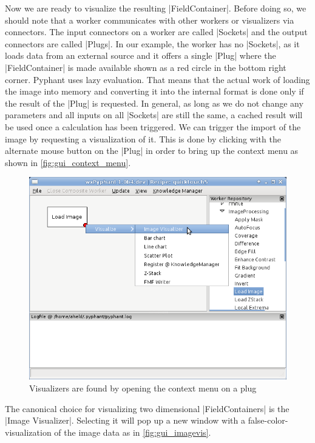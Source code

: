 \documentclass[a4paper]{article}
\begin{document}
Now we are ready to visualize the resulting |FieldContainer|. Before
doing so, we should note that a worker communicates with other workers
or visualizers via connectors. The input connectors on a worker are
called |Sockets| and the output connectors are called |Plugs|. In our
example, the worker has no |Sockets|, as it loads data from an
external source and it offers a single |Plug| where the
|FieldContainer| is made available shown as a red circle in the bottom
right corner. Pyphant uses lazy evaluation. That means that the actual
work of loading the image into memory and converting it into the
internal format is done only if the result of the |Plug| is
requested. In general, as long as we do not change any parameters and
all inputs on all |Sockets| are still the same, a cached result will
be used once a calculation has been triggered. We can trigger the
import of the image by requesting a visualization of it. This is done
by clicking with the alternate mouse button on the |Plug| in order to
bring up the context menu as shown in \autoref{fig:gui_context_menu}.
\begin{figure}[h]
  \centering
  \includegraphics[scale=0.75]{fig/gui_context_menu.png}
  \caption{Visualizers are found by opening the context menu on a plug}
  \label{fig:gui_context_menu}
\end{figure}
The canonical choice for visualizing two dimensional |FieldContainers|
is the |Image Visualizer|. Selecting it will pop up a new window with
a false-color-visualization of the image data as in
\autoref{fig:gui_imagevis}.
\end{document}
